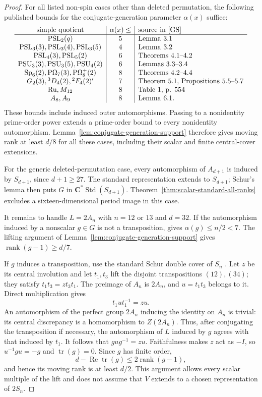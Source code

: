 \documentclass[11pt]{article}
\theoremstyle{definition}
\theoremstyle{remark}
\begin{document}
\begin{proof}
For all listed non-spin cases other than deleted permutation, the
following published bounds for the conjugate-generation parameter
$\alpha(x)$ suffice:
\[
\begin{array}{c|c|l}
 \text{simple quotient}&\alpha(x)\le&\text{source in \cite{GS}}\\ \hline
 \mathrm{PSL}_2(q)&5&\text{Lemma 3.1}\\
 \mathrm{PSL}_3(3),\mathrm{PSL}_3(4),\mathrm{PSL}_3(5)&4&\text{Lemma 3.2}\\
 \mathrm{PSL}_4(3),\mathrm{PSL}_5(2)&6&\text{Theorems 4.1--4.2}\\
 \mathrm{PSU}_3(3),\mathrm{PSU}_3(5),\mathrm{PSU}_4(2)&6&\text{Lemmas 3.3--3.4}\\
 \mathrm{Sp}_6(2),\mathrm{P}\Omega_7(3),\mathrm{P}\Omega^+_8(2)&8&\text{Theorems 4.2--4.4}\\
 G_2(3),{}^3D_4(2),{}^2F_4(2)'&7&\text{Theorem 5.1, Propositions 5.5--5.7}\\
 \mathrm{Ru},M_{12}&8&\text{Table 1, p. 554}\\
 A_8,A_9&8&\text{Lemma 6.1}.
\end{array}
\]
These bounds include induced outer automorphisms.  Passing to a
nonidentity prime-order power extends a prime-order bound to every
nonidentity automorphism.  Lemma~\ref{lem:conjugate-generation-support}
therefore gives moving rank at least $d/8$ for all these cases,
including their scalar and finite central-cover extensions.

For the generic deleted-permutation case, every automorphism of
$A_{d+1}$ is induced by $S_{d+1}$, since $d+1\ge27$.
The standard representation extends to $S_{d+1}$; Schur's lemma then
puts $G$ in $\mathbf C^*\operatorname{Std}(S_{d+1})$.
Theorem~\ref{thm:scalar-standard-all-ranks} excludes a
sixteen-dimensional period image in this case.

It remains to handle $L=2A_n$ with $n=12$ or $13$ and $d=32$.
If the automorphism induced by a nonscalar $g\in G$ is not a
transposition, \cite[Lemma~6.1]{GS} gives
$\alpha(g)\le n/2<7$.  The lifting argument of
Lemma~\ref{lem:conjugate-generation-support} gives
$\operatorname{rank}(g-1)\ge d/7$.

If $g$ induces a transposition, use the standard Schur double cover
of $S_n$ \cite[Section~4.1]{FayersMorotti}.
Let $z$ be its central involution and let $t_1,t_3$ lift
the disjoint transpositions $(12),(34)$; they satisfy
$t_1t_3=z t_3t_1$.  The preimage of $A_n$ is $2A_n$, and
$u=t_1t_3$ belongs to it.  Direct multiplication gives
\[
 t_1ut_1^{-1}=zu.
\]
An automorphism of the perfect group $2A_n$ inducing the identity
on $A_n$ is trivial: its central discrepancy is a homomorphism to
$Z(2A_n)$.  Thus, after conjugating the transposition if necessary,
the automorphism of $L$ induced by $g$ agrees with that induced by
$t_1$.  It follows that $gug^{-1}=zu$.
Faithfulness makes $z$ act as $-I$, so $u^{-1}gu=-g$ and
$\operatorname{tr}(g)=0$.  Since $g$ has finite order,
\[
 d-\operatorname{Re}\operatorname{tr}(g)
 \le2\operatorname{rank}(g-1),
\]
and hence its moving rank is at least $d/2$.
This argument allows every scalar multiple of the lift and does
not assume that $V$ extends to a chosen representation of $2S_n$.


\end{proof}
\end{document}
